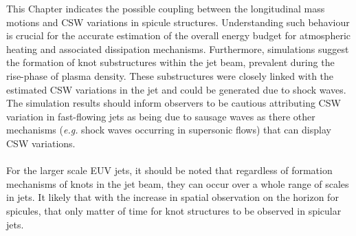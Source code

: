 \documentclass[12pt]{ociamthesis}
\newcommand{\np}{\\ \\}
\begin{document}
%
This Chapter indicates the possible coupling between the longitudinal mass motions and CSW variations in spicule structures. Understanding such behaviour is crucial for the accurate estimation of the overall energy budget for atmospheric heating and associated dissipation mechanisms. Furthermore, simulations suggest the formation of knot substructures within the jet beam, prevalent during the rise-phase of plasma density. These substructures were closely linked with the estimated CSW variations in the jet and could be generated due to shock waves. The simulation results should inform observers to be cautious attributing CSW variation in fast-flowing jets as being due to sausage waves as there other mechanisms (\textit{e.g.} shock waves occurring in supersonic flows) that can display CSW variations. \np
%
For the larger scale EUV jets, it should be noted that regardless of formation mechanisms of knots in the jet beam, they can occur over a whole range of scales in jets. It likely that with the increase in spatial observation on the horizon for spicules, that only matter of time for knot structures to be observed in spicular jets.


  
\end{document}
